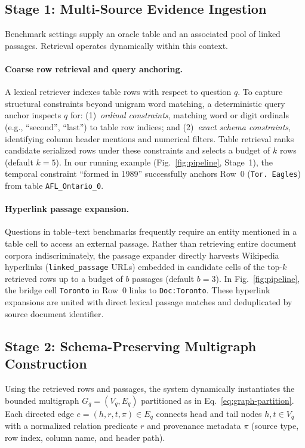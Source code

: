\subsection{Stage 1: Multi-Source Evidence Ingestion}
\label{sec:method-retrieval}
Benchmark settings supply an oracle table and an associated pool of linked passages. Retrieval operates dynamically within this context.

\paragraph{Coarse row retrieval and query anchoring.}
A lexical retriever indexes table rows with respect to question $q$. To capture structural constraints beyond unigram word matching, a deterministic query anchor inspects $q$ for: (1)~\emph{ordinal constraints}, matching word or digit ordinals (e.g., ``second'', ``last'') to table row indices; and (2)~\emph{exact schema constraints}, identifying column header mentions and numerical filters. Table retrieval ranks candidate serialized rows under these constraints and selects a budget of $k$ rows (default $k=5$). In our running example (Fig.~\ref{fig:pipeline}, Stage~1), the temporal constraint ``formed in 1989'' successfully anchors Row~0 (\texttt{Tor. Eagles}) from table \texttt{AFL\_Ontario\_0}.

\paragraph{Hyperlink passage expansion.}
Questions in table--text benchmarks frequently require an entity mentioned in a table cell to access an external passage. Rather than retrieving entire document corpora indiscriminately, the passage expander directly harvests Wikipedia hyperlinks (\texttt{linked\_passage} URLs) embedded in candidate cells of the top-$k$ retrieved rows up to a budget of $b$ passages (default $b=3$). In Fig.~\ref{fig:pipeline}, the bridge cell \texttt{Toronto} in Row~0 links to \texttt{Doc:Toronto}. These hyperlink expansions are united with direct lexical passage matches and deduplicated by source document identifier.

\subsection{Stage 2: Schema-Preserving Multigraph Construction}
\label{sec:method-kg}
Using the retrieved rows and passages, the system dynamically instantiates the bounded multigraph $G_q=(V_q, E_q)$ partitioned as in Eq.~\eqref{eq:graph-partition}. Each directed edge $e = (h, r, t, \pi) \in E_q$ connects head and tail nodes $h, t \in V_q$ with a normalized relation predicate $r$ and provenance metadata $\pi$ (source type, row index, column name, and header path).

